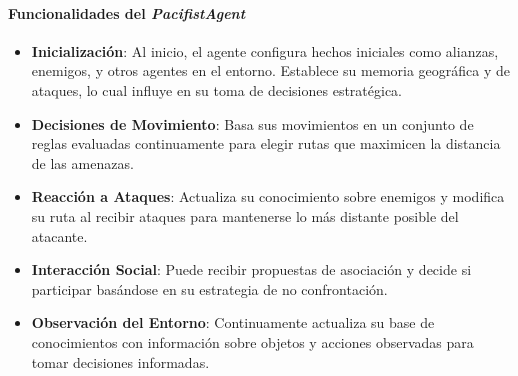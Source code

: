 \documentclass[11pt]{article}
\begin{document}
\paragraph{Funcionalidades del \textit{PacifistAgent}}
\begin{itemize}
    \item \textbf{Inicialización}: Al inicio, el agente configura hechos iniciales como alianzas, enemigos, y otros agentes en el entorno. Establece su memoria geográfica y de ataques, lo cual influye en su toma de decisiones estratégica.
    \item \textbf{Decisiones de Movimiento}: Basa sus movimientos en un conjunto de reglas evaluadas continuamente para elegir rutas que maximicen la distancia de las amenazas.
    \item \textbf{Reacción a Ataques}: Actualiza su conocimiento sobre enemigos y modifica su ruta al recibir ataques para mantenerse lo más distante posible del atacante.
    \item \textbf{Interacción Social}: Puede recibir propuestas de asociación y decide si participar basándose en su estrategia de no confrontación.
    \item \textbf{Observación del Entorno}: Continuamente actualiza su base de conocimientos con información sobre objetos y acciones observadas para tomar decisiones informadas.
\end{itemize}
\end{document}
